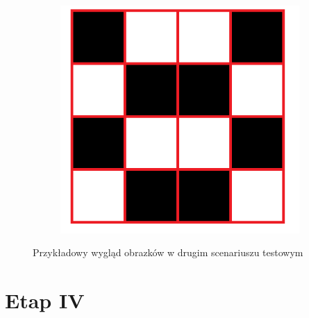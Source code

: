 \documentclass[a4paper, titleauthor]{mwart}
\begin{document}
\begin{figure}[htbp]
\begin{subfigure}{0,3\textwidth}
  \label{fig:sub2}
\end{subfigure}
\begin{subfigure}{0,3\textwidth}
  \centering
  \includegraphics[width=\linewidth]{OX3.png}
  \label{fig:sub3}
\end{subfigure}
\caption{Przykładowy wygląd obrazków w drugim scenariuszu testowym}
\label{fig:fig}
\end{figure}
\newpage
\section{\large Etap IV}
\end{document}
